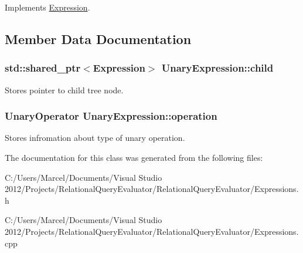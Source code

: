 Implements \hyperlink{class_expression_a77ac16bbb0df93de8a7711b2f7de889f}{Expression}.



\subsection{Member Data Documentation}
\hypertarget{class_unary_expression_ae9f51f996e3ec7f389dfce2105128eaf}{
\subsubsection[{child}]{\setlength{\rightskip}{0pt plus 5cm}std\+::shared\+\_\+ptr$<${\bf Expression}$>$ Unary\+Expression\+::child}}\label{class_unary_expression_ae9f51f996e3ec7f389dfce2105128eaf}
Stores pointer to child tree node. \hypertarget{class_unary_expression_af585b4a298cc9b170e26bdc0809c5175}{
\subsubsection[{operation}]{\setlength{\rightskip}{0pt plus 5cm}Unary\+Operator Unary\+Expression\+::operation}}\label{class_unary_expression_af585b4a298cc9b170e26bdc0809c5175}
Stores infromation about type of unary operation. 

The documentation for this class was generated from the following files\+:\begin{DoxyCompactItemize}
\item 
C\+:/\+Users/\+Marcel/\+Documents/\+Visual Studio 2012/\+Projects/\+Relational\+Query\+Evaluator/\+Relational\+Query\+Evaluator/Expressions.\+h\item 
C\+:/\+Users/\+Marcel/\+Documents/\+Visual Studio 2012/\+Projects/\+Relational\+Query\+Evaluator/\+Relational\+Query\+Evaluator/Expressions.\+cpp\end{DoxyCompactItemize}
